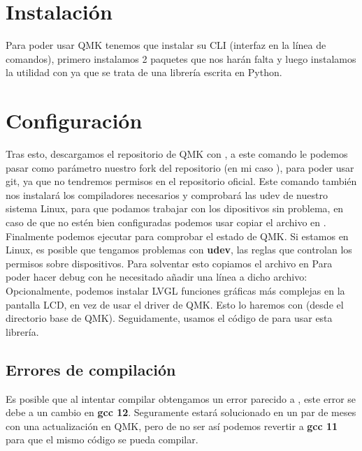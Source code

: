 \section{Instalación}
Para poder usar QMK tenemos que instalar su CLI (interfaz en la línea de comandos), primero instalamos 2 paquetes que nos harán falta  y luego instalamos la utilidad con  ya que se trata de una librería escrita en Python.

\section{Configuración}
Tras esto, descargamos el repositorio de QMK con , a este comando le podemos pasar como parámetro nuestro fork del repositorio (en mi caso ), para poder usar git, ya que no tendremos permisos en el repositorio oficial. Este comando también nos instalará los compiladores necesarios y comprobará las udev de nuestro sistema Linux, para que podamos trabajar con los dipositivos sin problema, en caso de que no estén bien configuradas podemos usar copiar el archivo  en . Finalmente podemos ejecutar  para comprobar el estado de QMK.
Si estamos en Linux, es posible que tengamos problemas con \textbf{udev}, las reglas que controlan los permisos sobre dispositivos. Para solventar esto copiamos el archivo  en  
Para poder hacer debug con  he necesitado añadir una línea a dicho archivo: \newline
{} \vspace{0.5cm} 
Opcionalmente, podemos instalar LVGL funciones gráficas más complejas en la pantalla LCD, en vez de usar el driver de QMK. Esto lo haremos con \newline
{} (desde el directorio base de QMK). Seguidamente, usamos el código de  para usar esta librería. \mybreak

    \subsection{Errores de compilación}
    Es posible que al intentar compilar obtengamos un error parecido a \newline
    , este error se debe a un cambio en \textbf{gcc 12}. Seguramente estará solucionado en un par de meses con una actualización en QMK, pero de no ser así podemos revertir a \textbf{gcc 11} para que el mismo código se pueda compilar.

